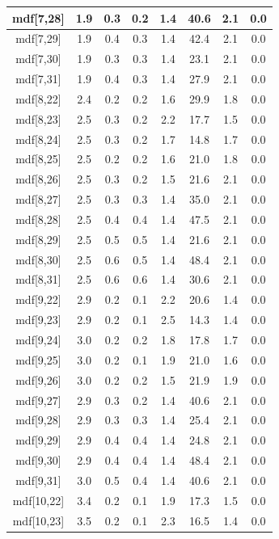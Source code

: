 \begin{longtable}{|c|c|c|c|c|c|c|c|}
\hline
mdf[7,28] & 1.9 & 0.3 & 0.2 & 1.4 & 40.6 & 2.1 & 0.0 \\
\hline
mdf[7,29] & 1.9 & 0.4 & 0.3 & 1.4 & 42.4 & 2.1 & 0.0 \\
\hline
mdf[7,30] & 1.9 & 0.3 & 0.3 & 1.4 & 23.1 & 2.1 & 0.0 \\
\hline
mdf[7,31] & 1.9 & 0.4 & 0.3 & 1.4 & 27.9 & 2.1 & 0.0 \\
\hline
mdf[8,22] & 2.4 & 0.2 & 0.2 & 1.6 & 29.9 & 1.8 & 0.0 \\
\hline
mdf[8,23] & 2.5 & 0.3 & 0.2 & 2.2 & 17.7 & 1.5 & 0.0 \\
\hline
mdf[8,24] & 2.5 & 0.3 & 0.2 & 1.7 & 14.8 & 1.7 & 0.0 \\
\hline
mdf[8,25] & 2.5 & 0.2 & 0.2 & 1.6 & 21.0 & 1.8 & 0.0 \\
\hline
mdf[8,26] & 2.5 & 0.3 & 0.2 & 1.5 & 21.6 & 2.1 & 0.0 \\
\hline
mdf[8,27] & 2.5 & 0.3 & 0.3 & 1.4 & 35.0 & 2.1 & 0.0 \\
\hline
mdf[8,28] & 2.5 & 0.4 & 0.4 & 1.4 & 47.5 & 2.1 & 0.0 \\
\hline
mdf[8,29] & 2.5 & 0.5 & 0.5 & 1.4 & 21.6 & 2.1 & 0.0 \\
\hline
mdf[8,30] & 2.5 & 0.6 & 0.5 & 1.4 & 48.4 & 2.1 & 0.0 \\
\hline
mdf[8,31] & 2.5 & 0.6 & 0.6 & 1.4 & 30.6 & 2.1 & 0.0 \\
\hline
mdf[9,22] & 2.9 & 0.2 & 0.1 & 2.2 & 20.6 & 1.4 & 0.0 \\
\hline
mdf[9,23] & 2.9 & 0.2 & 0.1 & 2.5 & 14.3 & 1.4 & 0.0 \\
\hline
mdf[9,24] & 3.0 & 0.2 & 0.2 & 1.8 & 17.8 & 1.7 & 0.0 \\
\hline
mdf[9,25] & 3.0 & 0.2 & 0.1 & 1.9 & 21.0 & 1.6 & 0.0 \\
\hline
mdf[9,26] & 3.0 & 0.2 & 0.2 & 1.5 & 21.9 & 1.9 & 0.0 \\
\hline
mdf[9,27] & 2.9 & 0.3 & 0.2 & 1.4 & 40.6 & 2.1 & 0.0 \\
\hline
mdf[9,28] & 2.9 & 0.3 & 0.3 & 1.4 & 25.4 & 2.1 & 0.0 \\
\hline
mdf[9,29] & 2.9 & 0.4 & 0.4 & 1.4 & 24.8 & 2.1 & 0.0 \\
\hline
mdf[9,30] & 2.9 & 0.4 & 0.4 & 1.4 & 48.4 & 2.1 & 0.0 \\
\hline
mdf[9,31] & 3.0 & 0.5 & 0.4 & 1.4 & 40.6 & 2.1 & 0.0 \\
\hline
mdf[10,22] & 3.4 & 0.2 & 0.1 & 1.9 & 17.3 & 1.5 & 0.0 \\
\hline
mdf[10,23] & 3.5 & 0.2 & 0.1 & 2.3 & 16.5 & 1.4 & 0.0 \\

\end{longtable}
